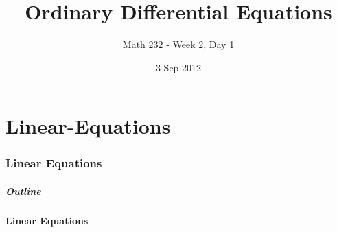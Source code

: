 \part{Linear-Equations}
\section{Linear Equations}


\title{Ordinary Differential Equations}
\subtitle{Math 232 - Week 2, Day 1}
\date{3 Sep 2012}

\begin{frame}
  \titlepage
\end{frame}

\begin{frame}
  \frametitle{Outline}
\end{frame}


\subsection{Linear Equations}


